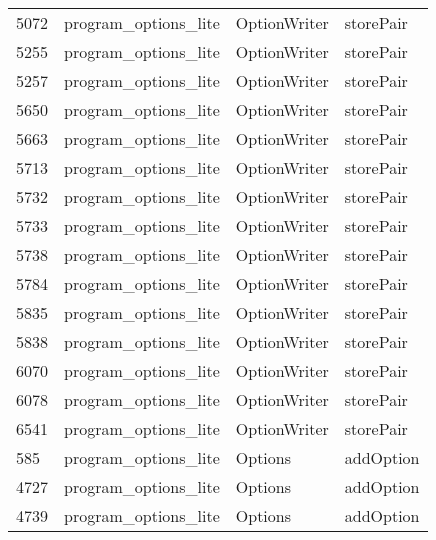\begin{tabular}{llll}
5072 &  program\_options\_lite &               OptionWriter &                                 storePair \\
5255 &  program\_options\_lite &               OptionWriter &                                 storePair \\
5257 &  program\_options\_lite &               OptionWriter &                                 storePair \\
5650 &  program\_options\_lite &               OptionWriter &                                 storePair \\
5663 &  program\_options\_lite &               OptionWriter &                                 storePair \\
5713 &  program\_options\_lite &               OptionWriter &                                 storePair \\
5732 &  program\_options\_lite &               OptionWriter &                                 storePair \\
5733 &  program\_options\_lite &               OptionWriter &                                 storePair \\
5738 &  program\_options\_lite &               OptionWriter &                                 storePair \\
5784 &  program\_options\_lite &               OptionWriter &                                 storePair \\
5835 &  program\_options\_lite &               OptionWriter &                                 storePair \\
5838 &  program\_options\_lite &               OptionWriter &                                 storePair \\
6070 &  program\_options\_lite &               OptionWriter &                                 storePair \\
6078 &  program\_options\_lite &               OptionWriter &                                 storePair \\
6541 &  program\_options\_lite &               OptionWriter &                                 storePair \\
585  &  program\_options\_lite &                    Options &                                 addOption \\
4727 &  program\_options\_lite &                    Options &                                 addOption \\
4739 &  program\_options\_lite &                    Options &                                 addOption \\

\end{tabular}
